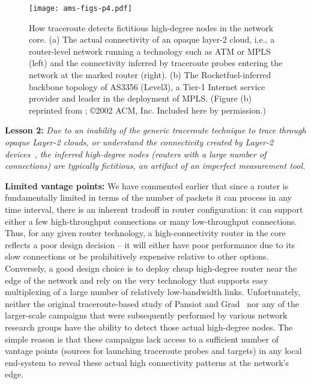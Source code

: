 \begin{figure}[thbp] 
  \begin{center}
    \texttt{[image: ams-figs-p4.pdf]}
    \caption{How traceroute detects fictitious high-degree nodes in
      the network core. (a) The actual connectivity of an opaque
      layer-2 cloud, i.e., a router-level network running a technology
      such as ATM or MPLS (left) and the connectivity inferred by
      traceroute probes entering the network at the marked router
      (right).  (b) The Rocketfuel-inferred backbone topology of
      AS3356 (Level3), a Tier-1 Internet service provider and leader
      in the deployment of MPLS.  (Figure (b) reprinted from \cite{rocketfuel_1};
      \copyright 2002 ACM, Inc. Included here by permission.)
      \label{fig:hot_4}}
  \end{center}
\end{figure}         

{\bf Lesson 2:} {\em Due to an inability of the generic traceroute
technique to trace through opaque Layer-2 clouds, or understand the
connectivity created by Layer-2
devices~\cite{Merindol:layer2:imc2010}, the inferred high-degree nodes
(\ie routers with a large number of connections) are typically
fictitious, an artifact of an imperfect measurement tool.}

{\bf Limited vantage points:} We have commented earlier
that since a router is fundamentally limited in terms of the number of
packets it can process in any time interval, there is an inherent
tradeoff in router configuration: it can support either a few
high-throughput connections or many low-throughput connections. Thus,
for any given router technology, a high-connectivity router in the
core reflects a poor design decision -- it will either have poor
performance due to its slow connections or be prohibitively expensive
relative to other options. Conversely, a good design choice is to
deploy cheap high-degree router near the edge of the network and rely
on the very technology that supports easy multiplexing of a large
number of relatively low-bandwidth links. Unfortunately, neither the
original traceroute-based study of Pansiot and
Grad~\cite{pansiot98:_inter} nor any of the larger-scale campaigns
that were subsequently performed by various network research groups
have the ability to detect those actual high-degree nodes. The simple
reason is that these campaigns lack access to a sufficient number of
vantage points (\ie sources for launching traceroute probes and
targets) in any local end-system to reveal these actual high
connectivity patterns at the network's edge.

